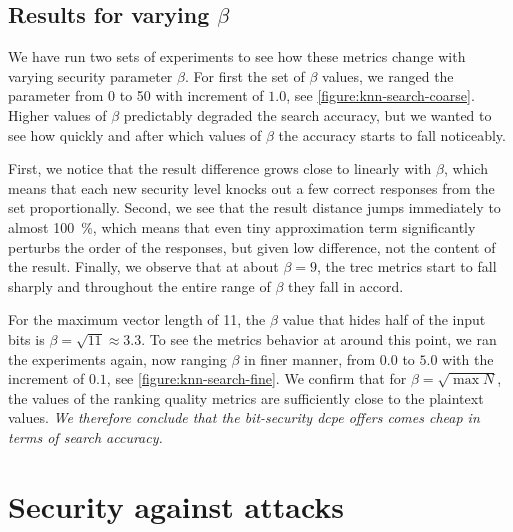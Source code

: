 			\subsection{Results for varying $\beta$}

				

				We have run two sets of experiments to see how these metrics change with varying security parameter $\beta$.
				For first the set of $\beta$ values, we ranged the parameter from 0 to 50 with increment of $1.0$, see \cref{figure:knn-search-coarse}.
				Higher values of $\beta$ predictably degraded the search accuracy, but we wanted to see how quickly and after which values of $\beta$ the accuracy starts to fall noticeably.

				First, we notice that the result difference grows close to linearly with $\beta$, which means that each new security level knocks out a few correct responses from the set proportionally.
				Second, we see that the result distance jumps immediately to almost \SI{100}{\percent}, which means that even tiny approximation term significantly perturbs the order of the responses, but given low difference, not the content of the result.
				Finally, we observe that at about $\beta = 9$, the \acrshort{trec} metrics start to fall sharply and throughout the entire range of $\beta$ they fall in accord.

				For the maximum vector length of 11, the $\beta$ value that hides half of the input bits is $\beta = \sqrt{11} \approx 3.3$.
				To see the metrics behavior at around this point, we ran the experiments again, now ranging $\beta$ in finer manner, from $0.0$ to $5.0$ with the increment of $0.1$, see \cref{figure:knn-search-fine}.
				We confirm that for $\beta = \sqrt{\max N}$, the values of the ranking quality metrics are sufficiently close to the plaintext values.
				\emph{We therefore conclude that the bit-security \acrshort{dcpe} offers comes cheap in terms of search accuracy.}

				

	\section{Security against attacks}\label{section:knn-snapshot:attacks}

